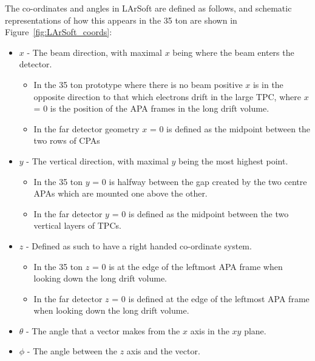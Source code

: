 The co-ordinates and angles in LArSoft are defined as follows, and schematic representations of how this appears in the 35 ton are shown in Figure~\ref{fig:LArSoft_coords}:
\begin{itemize}
\item $x$ - The beam direction, with maximal $x$ being where the beam enters the detector.
  \begin{itemize}
  \item In the 35 ton prototype where there is no beam positive $x$ is in the opposite direction to that which electrons drift in the large TPC, where $x$ = 0 is the position of the APA frames in the long drift volume.
  \item In the far detector geometry $x$ = 0 is defined as the midpoint between the two rows of CPAs 
  \end{itemize}
\item $y$ - The vertical direction, with maximal $y$ being the most highest point.
  \begin{itemize}
  \item In the 35 ton $y$ = 0 is halfway between the gap created by the two centre APAs which are mounted one above the other.
  \item In the far detector $y$ = 0 is defined as the midpoint between the two vertical layers of TPCs.
  \end {itemize}
\item $z$ - Defined as such to have a right handed co-ordinate system.
  \begin{itemize}
  \item In the 35 ton $z$ = 0 is at the edge of the leftmost APA frame when looking down the long drift volume.
  \item In the far detector $z$ = 0 is defined at the edge of the leftmost APA frame when looking down the long drift volume.
  \end{itemize}
\item $\theta$ - The angle that a vector makes from the $x$ axis in the $xy$ plane.
\item $\phi$ - The angle between the $z$ axis and the vector.
\end{itemize}

